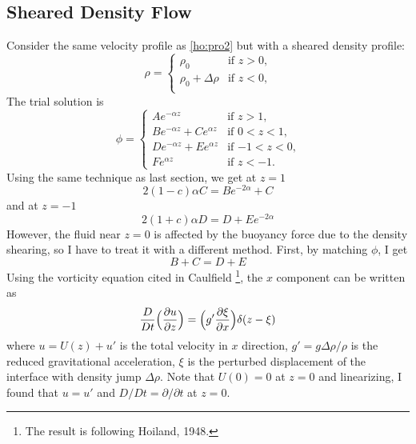 \subsection{Sheared Density Flow}
Consider the same velocity profile
as  \eqref{ho:pro2} but with a sheared density profile:
\begin{equation}\label{she1}
\rho =
\begin{cases}
\rho_0 &\text{if $z>0$,}\\
\rho_0+\Delta\rho &\text{if $z<0$,}\\
\end{cases}
\end{equation}
The trial solution is
\begin{equation}\label{she2}
\phi =
\begin{cases}
Ae^{-\alpha z} &\text{if $z>1$,}\\
Be^{-\alpha z} + Ce^{\alpha z} &\text{if $0<z<1$,}\\
De^{-\alpha z} + Ee^{\alpha z} &\text{if $-1<z<0$,}\\
Fe^{\alpha z} &\text{if $z<-1$.}
\end{cases}
\end{equation}
\newslide
Using the same technique as last section, we get at $z=1$
\begin{equation}\label{she3}
    2(1-c)\alpha C=Be^{-2\alpha}+C
\end{equation}
and at $z=-1$
\begin{equation}\label{she4}
    2(1+c)\alpha D=D+Ee^{-2\alpha}
\end{equation}
However, the fluid near $z=0$ is affected by the buoyancy force due
to the density shearing, so I have to treat it with a different
method. First, by matching $\phi$, I get
\begin{equation}\label{she5}
    B+C=D+E
\end{equation}
\newslide
Using the vorticity equation cited in Caulfield
\cite{Caulfield}\footnote{The result is following Hoiland, 1948.},
the $x$ component can be written as
\begin{equation}\label{she6}
    \frac{D}{Dt}\Bigl(\frac{\partial u}{\partial z}\Bigr)=
    \Bigl(g'\frac{\partial \xi}{\partial x}\Bigr)\delta(z-\xi)
\end{equation}
where $u=U(z)+u'$ is the total velocity in $x$ direction,
$g'=g\Delta\rho/\rho$ is the reduced gravitational acceleration,
$\xi$ is the perturbed displacement of the interface with density
jump $\Delta\rho$. Note that $U(0)=0$ at $z=0$ and linearizing, I
found that $u=u'$ and $D/Dt=\partial/\partial t$ at $z=0$.
